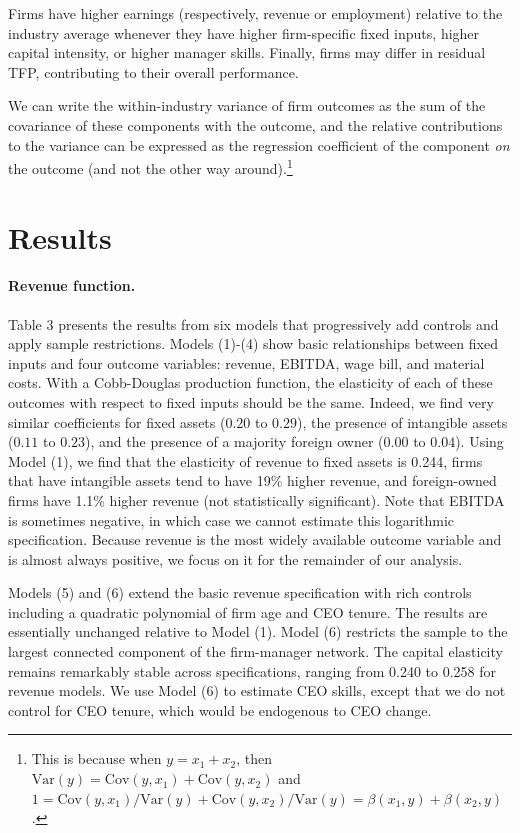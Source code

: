 \documentclass[11pt,a4paper]{article}
\newcommand{\Var}{\text{Var}}
\newcommand{\Cov}{\text{Cov}}
\begin{document}
Firms have higher earnings (respectively, revenue or employment) relative to the industry average whenever they have higher firm-specific fixed inputs, higher capital intensity, or higher manager skills. Finally, firms may differ in residual TFP, contributing to their overall performance.

We can write the within-industry variance of firm outcomes as the sum of the covariance of these components with the outcome, and the relative contributions to the variance can be expressed as the regression coefficient of the component \emph{on} the outcome (and not the other way around).\footnote{This is because when $y = x_1 + x_2$, then $\Var(y) = \Cov(y, x_1) + \Cov(y, x_2)$ and $1 = \Cov(y, x_1) / \Var(y) + \Cov(y, x_2) / \Var(y) = \beta(x_1, y) + \beta(x_2, y)$.}

\section{Results}

\paragraph{Revenue function.}
Table 3 presents the results from six models that progressively add controls and apply sample restrictions. Models (1)-(4) show basic relationships between fixed inputs and four outcome variables: revenue, EBITDA, wage bill, and material costs. With a Cobb-Douglas production function, the elasticity of each of these outcomes with respect to fixed inputs should be the same. Indeed, we find very similar coefficients for fixed assets ($0.20$ to $0.29$), the presence of intangible assets ($0.11$ to $0.23$), and the presence of a majority foreign owner ($0.00$ to $0.04$). Using Model (1), we find that the elasticity of revenue to fixed assets is 0.244, firms that have intangible assets tend to have 19\% higher revenue, and foreign-owned firms have 1.1\% higher revenue (not statistically significant). Note that EBITDA is sometimes negative, in which case we cannot estimate this logarithmic specification. Because revenue is the most widely available outcome variable and is almost always positive, we focus on it for the remainder of our analysis.

Models (5) and (6) extend the basic revenue specification with rich controls including a quadratic polynomial of firm age and CEO tenure. The results are essentially unchanged relative to Model (1). Model (6) restricts the sample to the largest connected component of the firm-manager network. The capital elasticity remains remarkably stable across specifications, ranging from 0.240 to 0.258 for revenue models. We use Model (6) to estimate CEO skills, except that we do not control for CEO tenure, which would be endogenous to CEO change.
\end{document}
